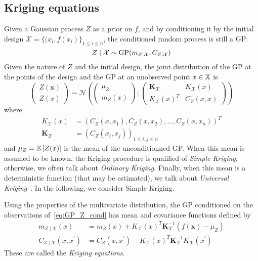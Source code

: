 \documentclass[../../Main_ManuscritThese.tex]{subfiles}
\begin{document}
\subsection{Kriging equations}
\label{sec:linear_estimation}
Given a Gaussian process $Z$ as a prior on $f$, and by conditioning it by the initial design $\mathcal{X} = \{(x_i, f(x_i)\}_{1 \leq i \leq n}$, the conditioned random process is still a GP:
\begin{equation}
  \label{eq:GP_Z_cond}
  Z \mid \mathcal{X} \sim \operatorname{\mathrm{GP}}(m_{Z\mid \mathcal{X}}, C_{Z\mid \mathcal{X}})
\end{equation}
Given the nature of $Z$ and the initial design, the joint distribution of the GP at the points of the design and the GP at an unobserved point $x \in \mathbb{X}$ is
\begin{equation}
  \label{eq:GP_joint_distrib}
  \begin{pmatrix}
    Z(\mathbf{x}) \\
    Z(x)
  \end{pmatrix} \sim
  \mathcal{N}\left(
    \begin{pmatrix}
      \mu_Z \\
      m_{Z}(x)
    \end{pmatrix} ;
    \begin{pmatrix}
      \mathbf{K}_{\mathcal{X}} & K_{\mathcal{X}}(x) \\
       K_{\mathcal{X}}(x)^T & C_Z(x, x)
    \end{pmatrix}
\right)
\end{equation}
where
\begin{align}
  K_{\mathcal{X}}(x) &= \left(C_Z(x, x_1),C_Z(x, x_2),\dots,C_Z(x,x_n)\right)^T \\
  \mathbf{K}_{\mathcal{X}} &= \left(C_Z(x_i, x_j)\right)_{1 \leq i,j \leq n}
\end{align}
and $\mu_Z = \mathbb{E}\left[Z(x)\right]$ is the mean of the unconditionned GP. When this mean is assumed to be known, the Kriging procedure is qualified of \emph{Simple Kriging}, otherwise, we often talk about \emph{Ordinary Kriging}. Finally, when this mean is a deterministic function (that may be estimated), we talk about \emph{Universal Kriging}~\cite{le_riche_introduction_2014}. In the following, we consider Simple Kriging.

Using the properties of the multivariate distribution, the GP conditioned on the observations of~\eqref{eq:GP_Z_cond} has mean and covariance functions defined by
\begin{align}
  m_{Z \mid \mathcal{X}}(x) &= m_Z(x) + K_{\mathcal{X}}(x)^T \mathbf{K}_{\mathcal{X}}^{-1}(f(\mathbf{x}) - \mu_Z ) \\
  C_{Z\mid \mathcal{X}}(x, x^\prime) &= C_Z(x, x^\prime)  - K_{\mathcal{X}}(x)^T\mathbf{K}_{\mathcal{X}}^{-1}K_{\mathcal{X}}(x^\prime)
\end{align}
These are called the \emph{Kriging equations}.
\end{document}
